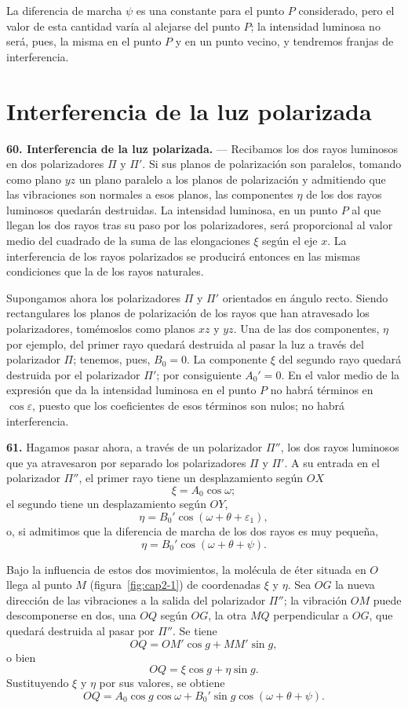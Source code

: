 La diferencia de marcha $\psi$ es una constante para el punto $P$
considerado, pero el valor de esta cantidad varía al alejarse del punto
$P$; la intensidad luminosa no será, pues, la misma en el punto $P$ y en
un punto vecino, y tendremos franjas de interferencia.

\section{Interferencia de la luz polarizada}

\noindent\textbf{60. Interferencia de la luz polarizada.} — Recibamos los
dos rayos luminosos en dos polarizadores $\Pi$ y $\Pi'$. Si sus planos de
polarización son paralelos, tomando como plano $yz$ un plano paralelo a
los planos de polarización y admitiendo que las vibraciones son normales
a esos planos, las componentes $\eta$ de los dos rayos luminosos quedarán
destruidas. La intensidad luminosa, en un punto $P$ al que llegan los dos
rayos tras su paso por los polarizadores, será proporcional al valor
medio del cuadrado de la suma de las elongaciones $\xi$ según el eje $x$.
La interferencia de los rayos polarizados se producirá entonces en las
mismas condiciones que la de los rayos naturales.

Supongamos ahora los polarizadores $\Pi$ y $\Pi'$ orientados en ángulo
recto. Siendo rectangulares los planos de polarización de los rayos que
han atravesado los polarizadores, tomémoslos como planos $xz$ y $yz$. Una
de las dos componentes, $\eta$ por ejemplo, del primer rayo quedará
destruida al pasar la luz a través del polarizador $\Pi$; tenemos, pues,
$B_0=0$. La componente $\xi$ del segundo rayo quedará destruida por el
polarizador $\Pi'$; por consiguiente $A_0'=0$. En el valor medio de la
expresión que da la intensidad luminosa en el punto $P$ no habrá
términos en $\cos\varepsilon$, puesto que los coeficientes de esos
términos son nulos; no habrá interferencia.

\noindent\textbf{61.} Hagamos pasar ahora, a través de un polarizador
$\Pi''$, los dos rayos luminosos que ya atravesaron por separado los
polarizadores $\Pi$ y $\Pi'$. A su entrada en el polarizador $\Pi''$, el
primer rayo tiene un desplazamiento según $OX$
\[
\xi=A_0\cos\omega;
\]
el segundo tiene un desplazamiento según $OY$,
\[
\eta=B_0'\cos(\omega+\theta+\varepsilon_1),
\]
o, si admitimos que la diferencia de marcha de los dos rayos es muy
pequeña,
\[
\eta=B_0'\cos(\omega+\theta+\psi).
\]

Bajo la influencia de estos dos movimientos, la molécula de éter situada
en $O$ llega al punto $M$ (figura~\ref{fig:cap2-1}) de coordenadas $\xi$
y $\eta$. Sea $OG$ la nueva dirección de las vibraciones a la salida del
polarizador $\Pi''$; la vibración $OM$ puede descomponerse en dos, una
$OQ$ según $OG$, la otra $MQ$ perpendicular a $OG$, que quedará destruida
al pasar por $\Pi''$. Se tiene
\[
OQ = OM'\cos g + MM'\sin g,
\]
o bien
\[
OQ = \xi\cos g + \eta\sin g.
\]
Sustituyendo $\xi$ y $\eta$ por sus valores, se obtiene
\[
OQ = A_0\cos g\cos\omega + B_0'\sin g\cos(\omega+\theta+\psi).
\]

